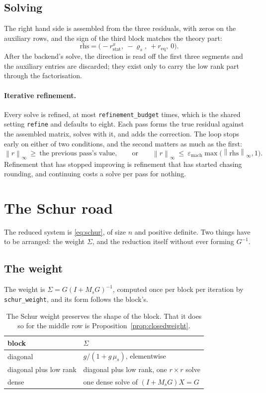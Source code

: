 \documentclass[a4paper,11pt]{book}
\theoremstyle{plain}
\theoremstyle{definition}
\theoremstyle{remark}
\numberwithin{equation}{chapter}
\numberwithin{algorithm}{chapter}
\newcommand{\norm}[1]{\left\|#1\right\|}
\begin{document}
	\subsection{Solving}

	The right hand side is assembled from the three residuals, with zeros on the
	auxiliary rows, and the sign of the third block matches the theory part:
	\[
	\text{rhs}=\bigl(-r^{x}_{\mathrm{stat}},\ -\varrho_s,\ +r_{\mathrm{eq}},\
	0\bigr) .
	\]
	After the backend's solve, the direction is read off the first three segments
	and the auxiliary entries are discarded; they exist only to carry the low rank
	part through the factorisation.

	\paragraph{Iterative refinement.}
	Every solve is refined, at most \texttt{refinement\_budget} times, which is
	the shared setting \texttt{refine} and defaults to eight. Each pass forms the true residual against the assembled
	matrix, solves with it, and adds the correction. The loop stops early on
	either of two conditions, and the second matters as much as the first:
	\[
	\norm{r}_\infty\ \geq\ \text{the previous pass's value},
	\qquad\text{or}\qquad
	\norm{r}_\infty\ \leq\ \varepsilon_{\mathrm{mach}}\max\bigl(
	\norm{\text{rhs}}_\infty,1\bigr) .
	\]
	Refinement that has stopped improving is refinement that has started chasing
	rounding, and continuing costs a solve per pass for nothing.

	\section{The Schur road}

	The reduced system is \eqref{eq:schur}, of size $n$ and positive definite. Two
	things have to be arranged: the weight $\Sigma$, and the reduction itself
	without ever forming $G^{-1}$.

	\subsection{The weight}

	The weight is $\Sigma=G(I+M_sG)^{-1}$, computed once per block per iteration
	by \texttt{schur\_weight}, and its form follows the block's.

	\begin{table}[H]
		\centering\small
		\begin{tabular}{ll}
			\toprule
			block & $\Sigma$\\
			\midrule
			diagonal & $g/(1+g\,\mu_s)$, elementwise\\
			diagonal plus low rank & diagonal plus low rank, one $r\times r$ solve\\
			dense & one dense solve of $(I+M_sG)X=G$\\
			\bottomrule
		\end{tabular}
		\caption{The Schur weight preserves the shape of the block. That it does so
			for the middle row is Proposition~\ref{prop:closedweight}.}
	\end{table}
\end{document}
